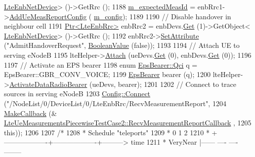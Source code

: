\begin{DoxyCode}
      \hyperlink{classns3_1_1LteEnbNetDevice}{LteEnbNetDevice}> ()->GetRrc ();
1188   \hyperlink{classLteUeMeasurementsPiecewiseTestCase2_af0d0ce23466c65b4ded17e0d8a5748bd}{m\_expectedMeasId} = enbRrc1->\hyperlink{classns3_1_1LteEnbRrc_a4b9348b6c39a805cd23d3ed4a5091ae5}{AddUeMeasReportConfig} (
      \hyperlink{classLteUeMeasurementsPiecewiseTestCase2_a90660b3f94d62547d30ea5d3eabebc80}{m\_config});
1189 
1190   \textcolor{comment}{// Disable handover in neighbour cell}
1191   \hyperlink{classns3_1_1Ptr}{Ptr<LteEnbRrc>} enbRrc2 = enbDevs.\hyperlink{classns3_1_1NetDeviceContainer_a677d62594b5c9d2dea155cc5045f4d0b}{Get} (1)->GetObject<
      \hyperlink{classns3_1_1LteEnbNetDevice}{LteEnbNetDevice}> ()->GetRrc ();
1192   enbRrc2->\hyperlink{classns3_1_1ObjectBase_ac60245d3ea4123bbc9b1d391f1f6592f}{SetAttribute} (\textcolor{stringliteral}{"AdmitHandoverRequest"}, \hyperlink{classns3_1_1BooleanValue}{BooleanValue} (\textcolor{keyword}{false}));
1193 
1194   \textcolor{comment}{// Attach UE to serving eNodeB}
1195   lteHelper->\hyperlink{classns3_1_1LteHelper_a9466743f826aa2652a87907b7f0a1c87}{Attach} (ueDevs.\hyperlink{classns3_1_1NetDeviceContainer_a677d62594b5c9d2dea155cc5045f4d0b}{Get} (0), enbDevs.\hyperlink{classns3_1_1NetDeviceContainer_a677d62594b5c9d2dea155cc5045f4d0b}{Get} (0));
1196 
1197   \textcolor{comment}{// Activate an EPS bearer}
1198   \textcolor{keyword}{enum} \hyperlink{structns3_1_1EpsBearer_aecf0c67109c5eb4ec0b07226fff5885e}{EpsBearer::Qci} q = EpsBearer::GBR\_CONV\_VOICE;
1199   \hyperlink{structns3_1_1EpsBearer}{EpsBearer} bearer (q);
1200   lteHelper->\hyperlink{classns3_1_1LteHelper_ac896e16cf162e4beeaa292d39ab1b700}{ActivateDataRadioBearer} (ueDevs, bearer);
1201 
1202   \textcolor{comment}{// Connect to trace sources in serving eNodeB}
1203   \hyperlink{group__config_ga4014f151241cd0939b6cb64409605736}{Config::Connect} (\textcolor{stringliteral}{"/NodeList/0/DeviceList/0/LteEnbRrc/RecvMeasurementReport"},
1204                    \hyperlink{group__makecallbackmemptr_ga9376283685aa99d204048d6a4b7610a4}{MakeCallback} (&
      \hyperlink{classLteUeMeasurementsPiecewiseTestCase2_ab39f5db572c10fb73def61678fd38940}{LteUeMeasurementsPiecewiseTestCase2::RecvMeasurementReportCallback}
      ,
1205                                  \textcolor{keyword}{this}));
1206 
1207   \textcolor{comment}{/*}
1208 \textcolor{comment}{   * Schedule "teleports"}
1209 \textcolor{comment}{   *          0                   1                   2}
1210 \textcolor{comment}{   *          +-------------------+-------------------+---------> time}
1211 \textcolor{comment}{   * VeryNear |------  ----    ----                    --------}

\end{DoxyCode}
